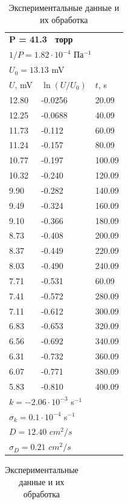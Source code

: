 \documentclass[a4paper,12pt]{article}
\begin{document}
	\begin{table}[h!]
		\caption{Экспериментальные данные и их обработка}
		\begin{center}
			
			
			
			\begin{tabular}{||l|l|l||}
				\hline
				
				\multicolumn{3}{||l||}{\textbf{P = 41.3  торр}} \\ 
				\multicolumn{3}{||l||}{$1 / P = 1.82 \cdot 10^{-4}$ $Па^{-1}$} \\ \hline
				\multicolumn{3}{||l||}{$U_0 = 13.13$ mV} \\ \hline
				$U$, mV&$\ln (U/U_0)$ & $t$, s \\ \hline
				12.80 & -0.0256   &20.09 \\ \hline
				12.25 &  -0.0688 &40.09 \\ \hline
				11.73 & -0.112 &60.09  \\ \hline
				11.24 & -0.157 &80.09  \\ \hline
				10.77 & -0.197 &100.09  \\ \hline
				10.32  & -0.240 &120.09  \\ \hline
				9.90 & 	-0.282 &140.09  \\ \hline
				9.49 & -0.324&160.09  \\ \hline
				9.10 & -0.366 &180.09  \\ \hline
				8.73 & -0.408 &200.09  \\ \hline
				8.37 & -0.449  &220.09  \\ \hline
				8.03 & -0.490 &240.09  \\ \hline
				7.71 & -0.531 &60.09  \\ \hline
				7.41 & -0.572 &280.09  \\ \hline
				7.11 & -0.612  &300.09  \\ \hline
				6.83 &-0.653 & 320.09  \\ \hline
				6.56 & -0.692&340.09  \\ \hline
				6.31 &-0.732 & 360.09  \\ \hline
				6.07 & 	-0.771 &380.09  \\ \hline
				5.83  & -0.810 &400.09  \\ \hline
				\multicolumn{3}{||l||}{$k = -2.06 \cdot 10^{-3}$ s$^{-1}$} \\ 
				\multicolumn{3}{||l||}{$\sigma_k =0.1 \cdot 10^{-4}$ s$^{-1}$} \\ \hline 
				\multicolumn{3}{||l||}{$D = 12.40$ $cm^2/s$}\\ 
				\multicolumn{3}{||l||}{$\sigma_D =0.21$ $cm^2/s$} \\ \hline 
			\end{tabular}\begin{tabular}{||l|l|l||}
				\hline
				

\end{tabular}
\end{center}
\end{table}
\end{document}
